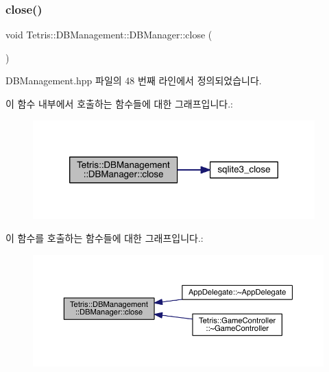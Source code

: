 \subsubsection{\texorpdfstring{close()}{close()}}
{\footnotesize\ttfamily void Tetris\+::\+D\+B\+Management\+::\+D\+B\+Manager\+::close (\begin{DoxyParamCaption}{ }\end{DoxyParamCaption})\hspace{0.3cm}{\ttfamily [inline]}}



D\+B\+Management.\+hpp 파일의 48 번째 라인에서 정의되었습니다.

이 함수 내부에서 호출하는 함수들에 대한 그래프입니다.\+:
\nopagebreak
\begin{figure}[H]
\begin{center}
\leavevmode
\includegraphics[width=308pt]{class_tetris_1_1_d_b_management_1_1_d_b_manager_a8390e6ddf3fa06e90fa5c2ab4997e5c1_cgraph}
\end{center}
\end{figure}
이 함수를 호출하는 함수들에 대한 그래프입니다.\+:
\nopagebreak
\begin{figure}[H]
\begin{center}
\leavevmode
\includegraphics[width=350pt]{class_tetris_1_1_d_b_management_1_1_d_b_manager_a8390e6ddf3fa06e90fa5c2ab4997e5c1_icgraph}
\end{center}
\end{figure}
\mbox{\label{class_tetris_1_1_d_b_management_1_1_d_b_manager_a5d49e7fac7d2a65973151a7fb81ea560}} 

